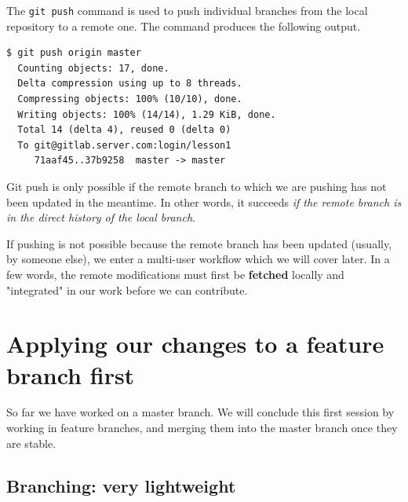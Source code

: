 \documentclass{../common/tufte-latex/tufte-handout}
\begin{document}
The \texttt{git push} command is used to push individual branches from the local repository to a remote one.
The command produces the following output.

\begin{lstlisting}[style=BashInputStyle]
  $ git push origin master 
  Counting objects: 17, done.
  Delta compression using up to 8 threads.
  Compressing objects: 100% (10/10), done.
  Writing objects: 100% (14/14), 1.29 KiB, done.
  Total 14 (delta 4), reused 0 (delta 0)
  To git@gitlab.server.com:login/lesson1
     71aaf45..37b9258  master -> master
\end{lstlisting}

Git push is only possible if the remote branch to which we are pushing has not been updated in the meantime.
In other words, it succeeds \textit{if the remote branch is in the direct history of the local branch}.

If pushing is not possible because the remote branch has been updated (usually, by someone else), we enter a multi-user workflow which we will cover later.
In a few words, the remote modifications must first be \textbf{fetched} locally and "integrated" in our work before we can contribute.

\section{Applying our changes to a feature branch first}

So far we have worked on a master branch.
We will conclude this first session by working in feature branches, and merging them into the master branch once they are stable.

\subsection{Branching: very lightweight}
\end{document}
